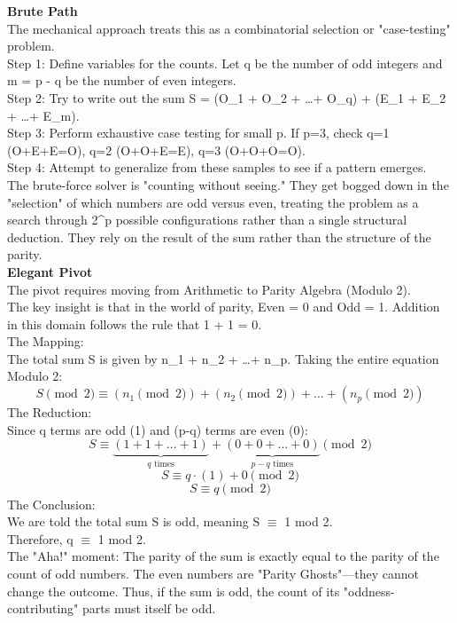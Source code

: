 \documentclass{article}
\begin{document}
\noindent \textbf{Brute Path} \\
The mechanical approach treats this as a combinatorial selection or "case-testing" problem. \\
Step 1: Define variables for the counts. Let q be the number of odd integers and m = p - q be the number of even integers. \\
Step 2: Try to write out the sum S = (O_1 + O_2 + \dots + O_q) + (E_1 + E_2 + \dots + E_m). \\
Step 3: Perform exhaustive case testing for small p. If p=3, check q=1 (O+E+E=O), q=2 (O+O+E=E), q=3 (O+O+O=O). \\
Step 4: Attempt to generalize from these samples to see if a pattern emerges. \\
The brute-force solver is "counting without seeing." They get bogged down in the "selection" of which numbers are odd versus even, treating the problem as a search through 2^p possible configurations rather than a single structural deduction. They rely on the result of the sum rather than the structure of the parity. \\

\noindent \textbf{Elegant Pivot} \\
The pivot requires moving from Arithmetic to Parity Algebra (Modulo 2). \\
The key insight is that in the world of parity, Even = 0 and Odd = 1. Addition in this domain follows the rule that 1 + 1 = 0. \\
The Mapping: \\
The total sum S is given by n_1 + n_2 + \dots + n_p. Taking the entire equation Modulo 2:
\begin{equation*}
    S \pmod 2 \equiv (n_1 \pmod 2) + (n_2 \pmod 2) + \dots + (n_p \pmod 2)
\end{equation*}
The Reduction: \\
Since q terms are odd (1) and (p-q) terms are even (0):
\begin{equation*}
    S \equiv \underbrace{(1 + 1 + \dots + 1)}_{q \text{ times}} + \underbrace{(0 + 0 + \dots + 0)}_{p-q \text{ times}} \pmod 2
\end{equation*}
\begin{equation*}
    S \equiv q \cdot (1) + 0 \pmod 2
\end{equation*}
\begin{equation*}
    S \equiv q \pmod 2
\end{equation*}
The Conclusion: \\
We are told the total sum S is odd, meaning S $\equiv$ 1 mod 2. \\
Therefore, q $\equiv$ 1 mod 2. \\
The "Aha!" moment: The parity of the sum is exactly equal to the parity of the count of odd numbers. The even numbers are "Parity Ghosts"—they cannot change the outcome. Thus, if the sum is odd, the count of its "oddness-contributing" parts must itself be odd. \\
\end{document}
